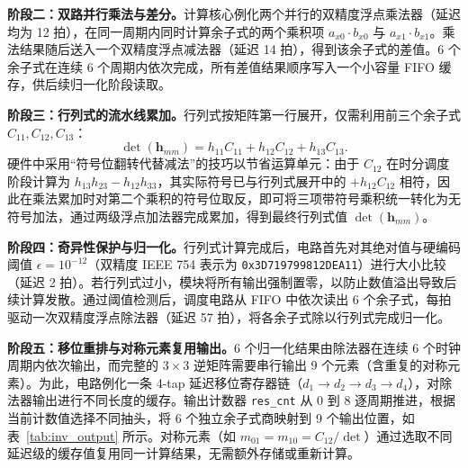 \textbf{阶段二：双路并行乘法与差分。}计算核心例化两个并行的双精度浮点乘法器（延迟均为 12 拍），在同一周期内同时计算余子式的两个乘积项 $a_{x0} \cdot b_{x0}$ 与 $a_{x1} \cdot b_{x1}$。乘法结果随后送入一个双精度浮点减法器（延迟 14 拍），得到该余子式的差值。6 个余子式在连续 6 个周期内依次完成，所有差值结果顺序写入一个小容量 FIFO 缓存，供后续归一化阶段读取。

\textbf{阶段三：行列式的流水线累加。}行列式按矩阵第一行展开，仅需利用前三个余子式 $C_{11},C_{12},C_{13}$：
\begin{equation}
\det(\mathbf{h}_{mm}) = h_{11}C_{11} + h_{12}C_{12} + h_{13}C_{13}.
\end{equation}
硬件中采用“符号位翻转代替减法”的技巧以节省运算单元：由于 $C_{12}$ 在时分调度阶段计算为 $h_{13}h_{23}-h_{12}h_{33}$，其实际符号已与行列式展开中的 $+h_{12}C_{12}$ 相符，因此在乘法累加时对第二个乘积的符号位取反，即可将三项带符号乘积统一转化为无符号加法，通过两级浮点加法器完成累加，得到最终行列式值 $\det(\mathbf{h}_{mm})$。

\textbf{阶段四：奇异性保护与归一化。}行列式计算完成后，电路首先对其绝对值与硬编码阈值 $\epsilon = 10^{-12}$（双精度 IEEE 754 表示为 \texttt{0x3D719799812DEA11}）进行大小比较（延迟 2 拍）。若行列式过小，模块将所有输出强制置零，以防止数值溢出导致后续计算发散。通过阈值检测后，调度电路从 FIFO 中依次读出 6 个余子式，每拍驱动一次双精度浮点除法器（延迟 57 拍），将各余子式除以行列式完成归一化。

\textbf{阶段五：移位重排与对称元素复用输出。}6 个归一化结果由除法器在连续 6 个时钟周期内依次输出，而完整的 $3\times3$ 逆矩阵需要串行输出 9 个元素（含重复的对称元素）。为此，电路例化一条 4-tap 延迟移位寄存器链（$d_1 \to d_2 \to d_3 \to d_4$），对除法器输出进行不同长度的缓存。输出计数器 \texttt{res\_cnt} 从 0 到 8 逐周期推进，根据当前计数值选择不同抽头，将 6 个独立余子式商映射到 9 个输出位置，如表~\ref{tab:inv_output} 所示。对称元素（如 $m_{01}=m_{10}=C_{12}/\det$）通过选取不同延迟级的缓存值复用同一计算结果，无需额外存储或重新计算。

